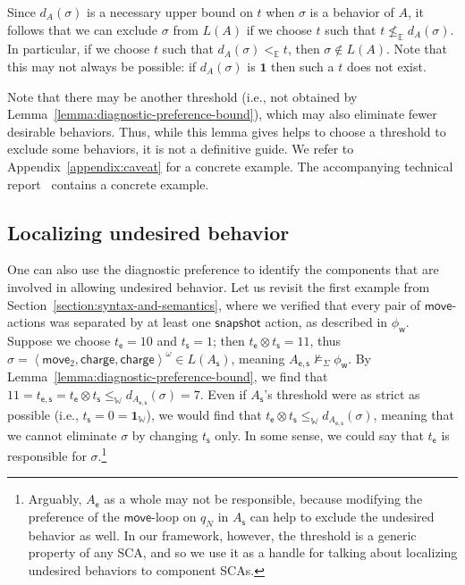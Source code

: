 \documentclass[a4paper]{article}
\newcommand{\angl}[1]{\left\langle#1\right\rangle}
\newcommand{\cstop}{\mathbf{1}}
\newcommand{\abscsemiring}{\mathbb{E}}
\newcommand{\wcsemiring}{\mathbb{W}}
\theoremstyle{definition}
\newcommand{\move}{\mathsf{move}}
\newcommand{\snapshot}{\mathsf{snapshot}}
\newcommand{\s}{\mathsf{s}}
\newcommand{\charge}{\mathsf{charge}}
\newcommand{\e}{\mathsf{e}}
\newcommand{\w}{\mathsf{w}}
\begin{document}
Since $d_A(\sigma)$ is a necessary upper bound on $t$ when $\sigma$ is a behavior of $A$, it follows that we can exclude $\sigma$ from $L(A)$ if we choose $t$ such that $t \not\leq_\abscsemiring d_A(\sigma)$. In particular, if we choose $t$ such that $d_A(\sigma) <_\abscsemiring t$, then $\sigma \not\in L(A)$. Note that this may not always be possible: if $d_A(\sigma)$ is $\cstop$ then such a $t$ does not exist.

Note that there may be another threshold (i.e., not obtained by Lemma~\ref{lemma:diagnostic-preference-bound}), which may also eliminate fewer desirable behaviors. Thus, while this lemma gives helps to choose a threshold to exclude some behaviors, it is not a definitive guide. 
\iftechreport%
We refer to Appendix~\ref{appendix:caveat} for a concrete example.
\else%
The accompanying technical report~\cite{kappe-arbab-talcott-2017-techreport} contains a concrete example.
\fi%

\subsection{Localizing undesired behavior}

One can also use the diagnostic preference to identify the components that are involved in allowing undesired behavior. Let us revisit the first example from Section~\ref{section:syntax-and-semantics}, where we verified that every pair of $\move$-actions was separated by at least one $\snapshot$ action, as described in $\phi_\w$. Suppose we choose $t_\e = 10$ and $t_\s = 1$; then $t_\e \otimes t_\s = 11$, thus $\sigma = \angl{\move_2, \charge, \charge}^\omega \in L(A_\s)$, meaning $A_{\e,\s} \not\models_\Sigma \phi_\w$. By Lemma~\ref{lemma:diagnostic-preference-bound}, we find that $11 = t_{\e, \s} = t_\e \otimes t_\s \leq_\wcsemiring d_{A_{\e,\s}}(\sigma) = 7$.
Even if $A_\s$'s threshold were as strict as possible (i.e., $t_\s = 0 = \cstop_\wcsemiring$), we would find that $t_\e \otimes t_\s \leq_\wcsemiring d_{A_{\e,\s}}(\sigma)$, meaning that we cannot eliminate $\sigma$ by changing $t_\s$ only. In some sense, we could say that $t_\e$ is responsible for $\sigma$.\footnote{Arguably, $A_\e$ as a whole may not be responsible, because modifying the preference of the $\move$-loop on $q_N$ in $A_\s$ can help to exclude the undesired behavior as well. In our framework, however, the threshold is a generic property of any SCA, and so we use it as a handle for talking about localizing undesired behaviors to component SCAs.} 
\end{document}
